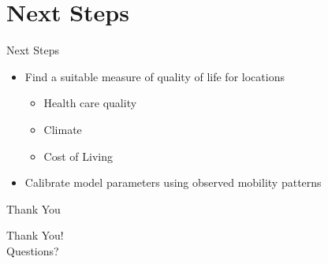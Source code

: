 \documentclass{beamer}
\begin{document}
\section{Next Steps}
\begin{frame}{Next Steps}
  \begin{itemize}
    \item Find a suitable measure of quality of life for locations
    \begin{itemize}
      \item Health care quality
      \item Climate
      \item Cost of Living
    \end{itemize}
    \item Calibrate model parameters using observed mobility patterns
  \end{itemize}
\end{frame}
\begin{frame}{Thank You}
  \begin{center}
    \Huge Thank You! \\
    \vspace{1cm}
    \Large Questions?
  \end{center}
\end{frame}
\end{document}
